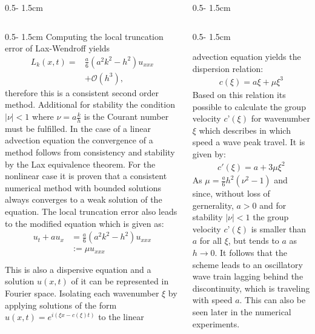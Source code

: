\documentclass{uibposter}
\begin{document}
\begin{frame}[fragile]
\begin{columns}
\begin{column}{0.5\textwidth - 1.5cm}
\begin{column}{0.5\textwidth - 1.5cm}
\vspace{0.5cm}
Computing the local truncation error of Lax-Wendroff yields
\begin{align*}
L_k(x, t) = &\frac{a}{6}(a^2 k^2 - h^2)u_{xxx} \\
&+ \mathcal{O}(h^3) \text{,}
\end{align*}
therefore this is a consistent second order method. Additional for stability the condition $|\nu| < 1$ where $\nu = a\frac{k}{h}$ is the Courant number must be fulfilled. 
In the case of a linear advection equation the convergence of a method follows from consistency and stability by the Lax equivalence theorem. For the nonlinear case it is proven that a consistent numerical method with bounded solutions always converges to a weak solution of the equation.
The local truncation error also leads to the modified equation which is given as:
\begin{align*}
u_t + a u_x &= \frac{a}{6} (a^2 k^2 - h^2) u_{xxx}\\
&:= \mu u_{xxx}
\end{align*}

This is also a dispersive equation and a solution $u(x, t)$ of it can be represented in Fourier space. Isolating each wavenumber $\xi$ by applying solutions of the form $u(x,t) = e^{i(\xi x - c(\xi)t)}$ to the linear

    \end{column}
\end{column}
\begin{column}{0.5\textwidth - 1.5cm}
\begin{column}{0.5\textwidth - 1.5cm}
\vspace*{-1.7cm}

advection equation yields the dispersion relation:
\begin{align*}
c(\xi) = a\xi + \mu \xi^3
\end{align*}
Based on this relation its possible to calculate the group velocity $c’(\xi)$ for wavenumber $\xi$ which describes in which speed a wave peak travel. It is given by:
\begin{align*}
c'(\xi) = a + 3\mu \xi^2
\end{align*}
As $\mu = \frac{a}{6}h^2(\nu^2 - 1)$ and since, without loss of gernerality, $a > 0$ and for stability $|\nu| < 1$ the group velocity $c’(\xi)$ is smaller than $a$ for all $\xi$, but tends to $a$ as $h\rightarrow0$. It follows that the scheme leads to an oscillatory wave train lagging behind the discontinuity, which is traveling with speed $a$. This can also be seen later in the numerical experiments.
    

\end{column}
\end{column}
\end{columns}
\end{frame}
\end{document}
